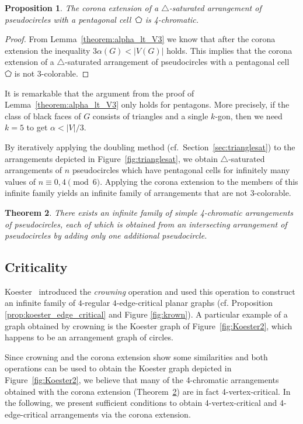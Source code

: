 \documentclass[fontsize=11pt,a4paper,DIV12]{scrartcl}
\newtheorem{theorem}{Theorem}
\newtheorem{proposition}[theorem]{Proposition}
\begin{document}
\begin{proposition}\label{prop:corona_4col}
  The corona extension of a $\triangle$-saturated arrangement of pseudocircles
  with a pentagonal cell~$\pentagon$ is 4-chromatic.
\end{proposition}

\begin{proof}
  From Lemma~\ref{theorem:alpha_lt_V3} we know that after the corona extension
  the inequality $3\alpha(G) < |V(G)|$ holds.  This implies that the corona
  extension of a $\triangle$-saturated arrangement of pseudocircles with a
  pentagonal cell~$\pentagon$ is not 3-colorable.
\end{proof}

It is remarkable that the argument from the proof of
Lemma~\ref{theorem:alpha_lt_V3} only holds for pentagons. More precisely, if
the class of black faces of $G$ consists of triangles and a single $k$-gon,
then we need $k=5$ to get $\alpha < |V|/3$.


By iteratively applying the doubling method (cf.\
Section~\ref{sec:trianglesat}) to the arrangements depicted in
Figure~\ref{fig:trianglesat}, we obtain $\triangle$-saturated arrangements of
$n$ pseudocircles which have pentagonal cells for infinitely many values of
$n \equiv 0,4 \pmod 6$.  Applying the corona
extension to the members of this infinite family yields an infinite family
of arrangements that are not 3-colorable.

\begin{theorem}
\label{thm:pentagon}
There exists an infinite family of simple 4-chromatic arrangements of
pseudocircles, each of which is obtained from an intersecting arrangement of
pseudocircles by adding only one additional pseudocircle.
\end{theorem}


\subsection{Criticality}
\label{subsec:criticality}

Koester~\cite{Koester1990} introduced the \emph{crowning} operation and used
this operation to construct an infinite family of 
$4$-regular $4$-edge-critical planar graphs (cf. Proposition \ref{prop:koester_edge_critical} and Figure \ref{fig:krown}). A particular example of a graph obtained by crowning
is the Koester graph of Figure~\ref{fig:Koester2}, which happens to be an
arrangement graph of circles. 

Since crowning and the corona extension show some similarities and both
operations can be used to obtain the Koester graph depicted in Figure~\ref{fig:Koester2},
we believe that many of the 4-chromatic arrangements obtained with the 
corona extension (Theorem~\ref{thm:pentagon}) are in fact  
4-vertex-critical. In the following, we present
sufficient conditions to obtain 4-vertex-critical and 4-edge-critical arrangements via the corona
extension.
\end{document}
